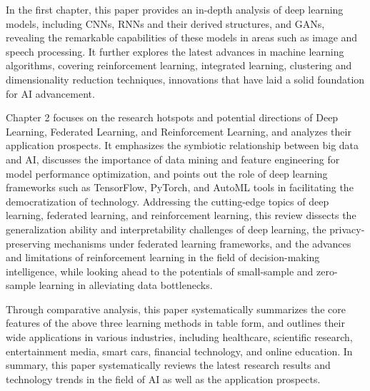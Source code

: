 In the first chapter, this paper provides an in-depth analysis of deep learning models, including CNNs, RNNs and their derived structures, and GANs, revealing the remarkable capabilities of these models in areas such as image and speech processing. It further explores the latest advances in machine learning algorithms, covering reinforcement learning, integrated learning, clustering and dimensionality reduction techniques, innovations that have laid a solid foundation for AI advancement.

Chapter 2 focuses on the research hotspots and potential directions of Deep Learning, Federated Learning, and Reinforcement Learning, and analyzes their application prospects. It emphasizes the symbiotic relationship between big data and AI, discusses the importance of data mining and feature engineering for model performance optimization, and points out the role of deep learning frameworks such as TensorFlow, PyTorch, and AutoML tools in facilitating the democratization of technology. Addressing the cutting-edge topics of deep learning, federated learning, and reinforcement learning, this review dissects the generalization ability and interpretability challenges of deep learning, the privacy-preserving mechanisms under federated learning frameworks, and the advances and limitations of reinforcement learning in the field of decision-making intelligence, while looking ahead to the potentials of small-sample and zero-sample learning in alleviating data bottlenecks.

Through comparative analysis, this paper systematically summarizes the core features of the above three learning methods in table form, and outlines their wide applications in various industries, including healthcare, scientific research, entertainment media, smart cars, financial technology, and online education. In summary, this paper systematically reviews the latest research results and technology trends in the field of AI as well as the application prospects.

